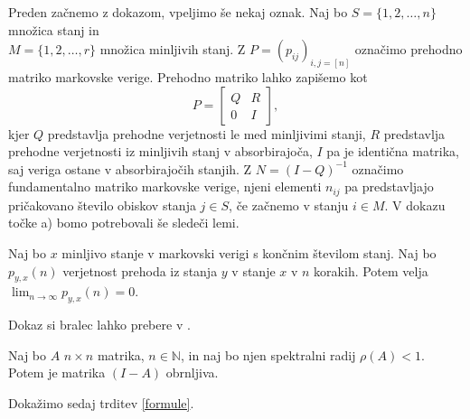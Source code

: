 \documentclass[twoside,11pt]{article}
\begin{document}
\noindent
Preden začnemo z dokazom, vpeljimo še nekaj oznak. Naj bo $S = \{1,2,\ldots,n\}$ množica stanj in \\ $M = \{1,2,\ldots,r\}$ množica minljivih stanj. Z $P = (p_{ij})_{i,j=[n]}$ označimo prehodno matriko markovske verige. Prehodno matriko lahko zapišemo kot 
$$ P =
\begin{bmatrix} 
    Q & R \\
    0 & I 
\end{bmatrix},
$$
     kjer $Q$ predstavlja prehodne verjetnosti le med minljivimi stanji, $R$ predstavlja prehodne verjetnosti iz minljivih stanj v absorbirajoča, $I$ pa je identična matrika, saj veriga ostane v absorbirajočih stanjih. Z $N = (I-Q)^{-1}$ označimo fundamentalno matriko markovske verige, njeni elementi $n_{ij}$  pa predstavljajo pričakovano število obiskov stanja $j\in S$, če začnemo v stanju $i\in M$. V dokazu točke a) bomo potrebovali še sledeči lemi.  
\smallskip

\begin{lema}\label{markovske}
    Naj bo $x$ minljivo stanje v markovski verigi s končnim številom stanj. Naj bo $p_{y,x}(n)$ verjetnost prehoda iz stanja $y$ v stanje $x$ v $n$ korakih. Potem velja $\lim_{n \to \infty} p_{y,x}(n) = 0$.
\end{lema}

\noindent Dokaz si bralec lahko prebere v \cite{ver}.
\begin{lema}\label{matrike}
    Naj bo $A$ $n\times n$ matrika, $n \in \mathbb{N}$, in naj bo njen spektralni radij $\rho(A)<1$. Potem je matrika $(I-A)$ obrnljiva.
\end{lema}


\noindent Dokažimo sedaj trditev \ref{formule}. \newline
\smallskip
\end{document}
